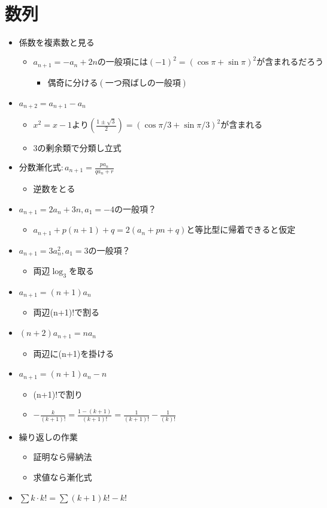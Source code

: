 \documentclass[dvipdfmx,uplatex]{jsarticle}
\begin{document}
\section{数列}
\begin{itemize}
	\item $ 係数を複素数と見る$
	\begin{itemize}
		\item $ a_{n+1} = -a_n + 2n の一般項には (-1)^2 = (\cos \pi + \sin \pi)^2 が含まれるだろう$
		\begin{itemize}
			\item $ 偶奇に分ける(一つ飛ばしの一般項)$
		\end{itemize}
	\end{itemize}
	\item $ a_{n+2} = a_{n+1} - a_n$
	\begin{itemize}
		\item $ x^2=x-1 より\left(\frac{1\pm\sqrt{3}}{2}\right) = (\cos \pi/3 + \sin \pi/3)^2 が含まれる$
		\item $ 3の剰余類で分類し立式$
	\end{itemize}
	\item $分数漸化式:a_{n+1}=\frac{pa_n}{qa_n+r}$
	\begin{itemize}
		\item 逆数をとる
	\end{itemize}
	\item $a_{n+1}=2a_n+3n,a_1=-4の一般項？$
	\begin{itemize}
		\item $a_{n+1}+p(n+1)+q=2(a_n+pn+q) と等比型に帰着できると仮定$
	\end{itemize}
	\item $a_{n+1}=3a_n^2,a_1=3の一般項？$
	\begin{itemize}
		\item $両辺\log_3を取る$
	\end{itemize}
	\item $a_{n+1}=(n+1)a_n$
	\begin{itemize}
		\item 両辺(n+1)!で割る
	\end{itemize}
	\item $(n+2)a_{n+1}=na_n$
	\begin{itemize}
		\item 両辺に(n+1)を掛ける
	\end{itemize}
	\item $a_{n+1}=(n+1)a_n-n$
	\begin{itemize}
		\item (n+1)!で割り
		\item $-\frac{k}{(k+1)!}=\frac{1-(k+1)}{(k+1)!}=\frac{1}{(k+1)!}-\frac{1}{(k)!}$
	\end{itemize}
	\item 繰り返しの作業
	\begin{itemize}
		\item 証明なら帰納法
		\item 求値なら漸化式
	\end{itemize}
	\item $\sum k \cdot k! = \sum (k+1)k! - k!$
\end{itemize}
\end{document}
